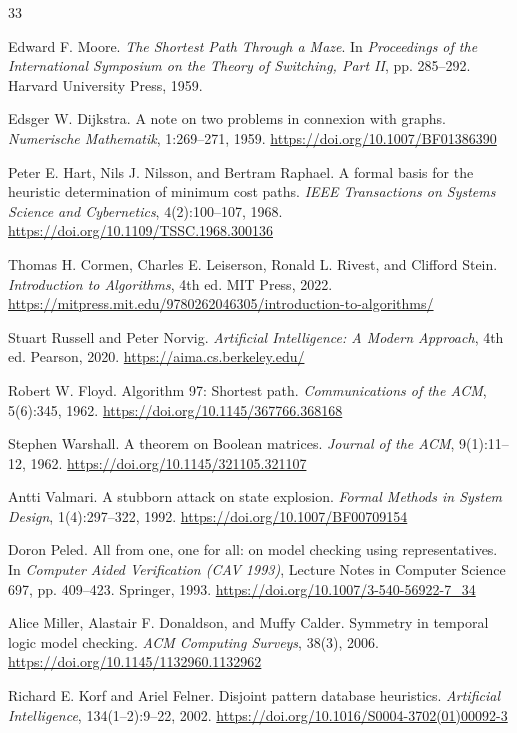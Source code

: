\begin{thebibliography}{33}

Edward F. Moore.
\emph{The Shortest Path Through a Maze}.
In \emph{Proceedings of the International Symposium on the Theory of Switching, Part II}, pp. 285--292. Harvard University Press, 1959.

Edsger W. Dijkstra.
A note on two problems in connexion with graphs.
\emph{Numerische Mathematik}, 1:269--271, 1959.
\url{https://doi.org/10.1007/BF01386390}

Peter E. Hart, Nils J. Nilsson, and Bertram Raphael.
A formal basis for the heuristic determination of minimum cost paths.
\emph{IEEE Transactions on Systems Science and Cybernetics}, 4(2):100--107, 1968.
\url{https://doi.org/10.1109/TSSC.1968.300136}

Thomas H. Cormen, Charles E. Leiserson, Ronald L. Rivest, and Clifford Stein.
\emph{Introduction to Algorithms}, 4th ed.
MIT Press, 2022.
\url{https://mitpress.mit.edu/9780262046305/introduction-to-algorithms/}

Stuart Russell and Peter Norvig.
\emph{Artificial Intelligence: A Modern Approach}, 4th ed.
Pearson, 2020.
\url{https://aima.cs.berkeley.edu/}

Robert W. Floyd.
Algorithm 97: Shortest path.
\emph{Communications of the ACM}, 5(6):345, 1962.
\url{https://doi.org/10.1145/367766.368168}

Stephen Warshall.
A theorem on Boolean matrices.
\emph{Journal of the ACM}, 9(1):11--12, 1962.
\url{https://doi.org/10.1145/321105.321107}

Antti Valmari.
A stubborn attack on state explosion.
\emph{Formal Methods in System Design}, 1(4):297--322, 1992.
\url{https://doi.org/10.1007/BF00709154}

Doron Peled.
All from one, one for all: on model checking using representatives.
In \emph{Computer Aided Verification (CAV 1993)}, Lecture Notes in Computer Science 697, pp. 409--423. Springer, 1993.
\url{https://doi.org/10.1007/3-540-56922-7_34}

Alice Miller, Alastair F. Donaldson, and Muffy Calder.
Symmetry in temporal logic model checking.
\emph{ACM Computing Surveys}, 38(3), 2006.
\url{https://doi.org/10.1145/1132960.1132962}

Richard E. Korf and Ariel Felner.
Disjoint pattern database heuristics.
\emph{Artificial Intelligence}, 134(1--2):9--22, 2002.
\url{https://doi.org/10.1016/S0004-3702(01)00092-3}


\end{thebibliography}

